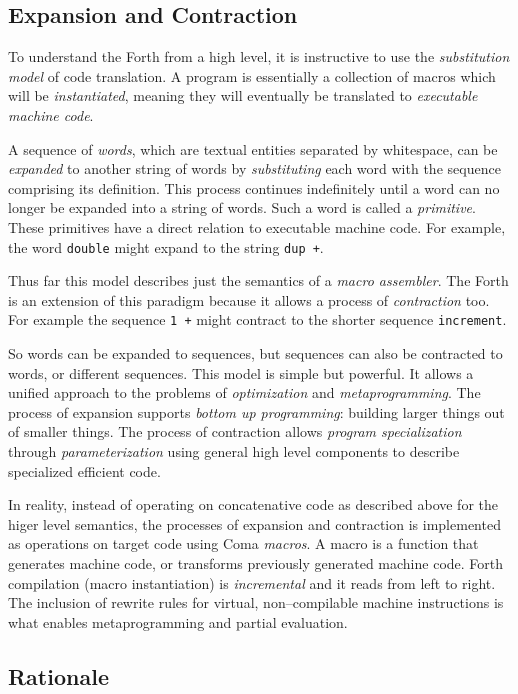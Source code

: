 \documentclass[12pt]{article}
\begin{document}
\subsection{Expansion and Contraction}

To understand the Forth from a high level, it is instructive to use
the \emph{substitution model} of code translation. A program is
essentially a collection of macros which will be \emph{instantiated},
meaning they will eventually be translated to \emph{executable machine
  code}.

A sequence of \emph{words}, which are textual entities separated by
whitespace, can be \emph{expanded} to another string of words by
\emph{substituting} each word with the sequence comprising its
definition. This process continues indefinitely until a word can no
longer be expanded into a string of words. Such a word is called a
\emph{primitive}. These primitives have a direct relation to
executable machine code. For example, the word \verb|double| might
expand to the string \verb|dup +|.

Thus far this model describes just the semantics of a \emph{macro
  assembler}. The Forth is an extension of this paradigm because it allows
a process of \emph{contraction} too. For example the sequence \verb|1 +|
might contract to the shorter sequence \verb|increment|.

So words can be expanded to sequences, but sequences can also be
contracted to words, or different sequences. This model is simple but
powerful. It allows a unified approach to the problems of
\emph{optimization} and \emph{metaprogramming}. The process of
expansion supports \emph{bottom up programming}: building larger
things out of smaller things. The process of contraction allows
\emph{program specialization} through \emph{parameterization} using
general high level components to describe specialized efficient code.

In reality, instead of operating on concatenative code as described
above for the higer level semantics, the processes of expansion and
contraction is implemented as operations on target code using Coma
\emph{macros}. A macro is a function that generates machine code, or
transforms previously generated machine code.  Forth compilation
(macro instantiation) is \emph{incremental} and it reads from left to
right. The inclusion of rewrite rules for virtual, non--compilable
machine instructions is what enables metaprogramming and partial
evaluation.

\subsection{Rationale}
\end{document}
